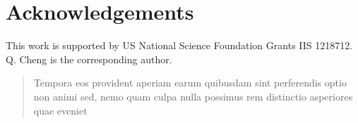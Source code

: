 \documentclass[letterpaper]{article}
\begin{document}
\section{Acknowledgements}
This work is supported by US National Science Foundation Grants IIS 1218712. Q. Cheng is the corresponding author.
\vfill\eject





\begin{quote}
\begin{small}

Tempora eos provident aperiam earum quibusdam sint perferendis optio non animi sed, nemo quam culpa nulla possimus rem distinctio asperiores quae eveniet

\end{small}
\end{quote}
\end{document}
